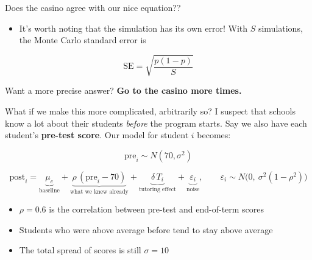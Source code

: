 \documentclass[
  ignorenonframetext,
  aspectratio=169,
]{beamer}
\providecommand{\tightlist}{%
  \setlength{\itemsep}{0pt}\setlength{\parskip}{0pt}}\usepackage{longtable,booktabs,array}
\begin{document}
\begin{frame}{Does the casino agree with our nice equation??}
\label{does-the-casino-agree-with-our-nice-equation-1}
\begin{itemize}
\tightlist
\item
  It's worth noting that the simulation has its own error! With \(S\)
  simulations, the Monte Carlo standard error is
\end{itemize}

\[
\text{SE} = \sqrt{\frac{p(1-p)}{S}}
\]

\begin{center}
Want a more precise answer? \textbf{Go to the casino more times.}
\end{center}
\end{frame}

\begin{frame}{What if we make this more complicated, arbitrarily so?}
\label{what-if-we-make-this-more-complicated-arbitrarily-so}
I suspect that schools know a lot about their students \emph{before} the
program starts. Say we also have each student's \textbf{pre-test score}.
Our model for student \(i\) becomes:

\[
\text{pre}_i \sim N(70, \sigma^2)
\]

\[
\text{post}_i = \underbrace{\mu_c}_{\text{baseline}} + 
\underbrace{\rho\,(\text{pre}_i - 70)}_{\text{what we knew already}} + 
\underbrace{\delta \, T_i}_{\text{tutoring effect}} + 
\underbrace{\varepsilon_i}_{\text{noise}}, 
\qquad \varepsilon_i \sim N\big(0,\ \sigma^2(1-\rho^2)\big)
\]

\vskip05pt

\begin{itemize}
\tightlist
\item
  \(\rho = 0.6\) is the correlation between pre-test and end-of-term
  scores
\item
  Students who were above average before tend to stay above average
\item
  The total spread of scores is still \(\sigma = 10\)
\end{itemize}
\end{frame}
\end{document}
